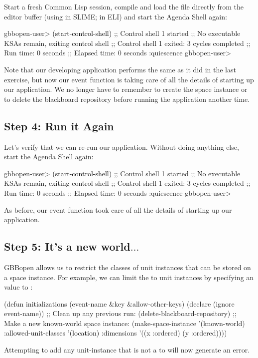 \documentclass[10pt,twoside,english,pdftex]{article}
\begin{document}
%
%
Start a fresh Common Lisp session, compile and load the
 file directly from the editor buffer (using
 in SLIME;  in ELI) and start the Agenda Shell
again:
%
\W\supp
\begin{example}
\textcolor{darkergray}{%
  gbbopen-user> \textcolor{black}{(start-control-shell)}
  ;; Control shell 1 started
  ;; No executable KSAs remain, exiting control shell
  ;; Control shell 1 exited: 3 cycles completed
  ;; Run time: 0 seconds
  ;; Elapsed time: 0 seconds
  :quiescence
  gbbopen-user>}
\end{example}

Note that our developing application performs the same as it did in the last
exercise, but now our  event function is taking care of
all the details of starting up our application.  We no longer have to remember
to create the  space instance or to delete the blackboard
repository before running the application another time.

\subsection*{Step 4: Run it Again}

%
%
Let's verify that we can re-run our application. Without doing anything else,
start the Agenda Shell again:
%
\W\supp
\begin{example}
\textcolor{darkergray}{%
  gbbopen-user> \textcolor{black}{(start-control-shell)}
  ;; Control shell 1 started
  ;; No executable KSAs remain, exiting control shell
  ;; Control shell 1 exited: 3 cycles completed
  ;; Run time: 0 seconds
  ;; Elapsed time: 0 seconds
  :quiescence
  gbbopen-user>}
\end{example}

As before, our  event function took care of all the
details of starting up our application.

\subsection*{Step 5: It's a new world$\ldots$}

%
%
GBBopen allows us to restrict the classes of unit instances that can be stored
on a space instance.  For example, we can limit the  to
 unit instances by specifying an 
value to :
%
\W\supp
\begin{example}
\textcolor{darkergray}{%
  (defun initializations (event-name &key &allow-other-keys)
    (declare (ignore event-name))
    ;; Clean up any previous run:
    (delete-blackboard-repository)
    ;; Make a new known-world space instance:
    (make-space-instance 
     '(known-world)
     \textcolor{black}{:allowed-unit-classes '(location)}
     :dimensions '((x :ordered) (y :ordered))))}
\end{example}
%
Attempting to add any unit-instance that is not a  to
 will now generate an error.
\end{document}
